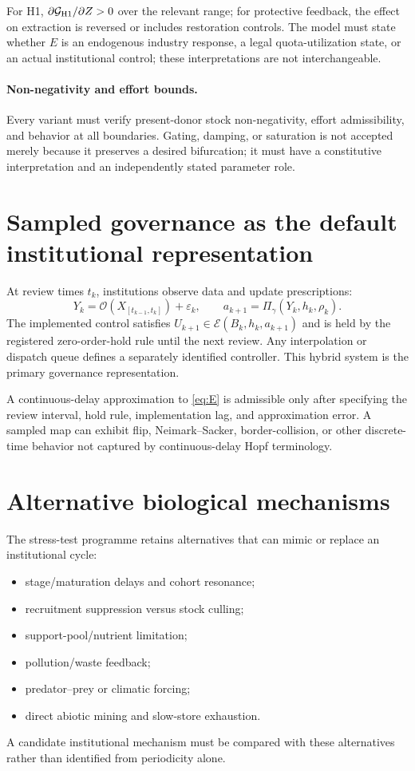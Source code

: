 \documentclass[11pt]{article}
\begin{document}
For H1, $\partial\mathcal G_{\rm H1}/\partial Z>0$ over the relevant range; for protective feedback, the effect on extraction is reversed or includes restoration controls. The model must state whether $E$ is an endogenous industry response, a legal quota-utilization state, or an actual institutional control; these interpretations are not interchangeable.

\paragraph{Non-negativity and effort bounds.} Every variant must verify present-donor stock non-negativity, effort admissibility, and behavior at all boundaries. Gating, damping, or saturation is not accepted merely because it preserves a desired bifurcation; it must have a constitutive interpretation and an independently stated parameter role.

\section{Sampled governance as the default institutional representation}
At review times $t_k$, institutions observe data and update prescriptions:
\[
Y_k=\mathcal O(X_{[t_{k-1},t_k]})+\varepsilon_k,
\qquad
a_{k+1}=\Pi_\gamma(Y_k,h_k,\rho_k).
\]
The implemented control satisfies $U_{k+1}\in\mathcal E(B_k,h_k,a_{k+1})$ and is held by the registered zero-order-hold rule until the next review. Any interpolation or dispatch queue defines a separately identified controller. This hybrid system is the primary governance representation.

A continuous-delay approximation to \eqref{eq:E} is admissible only after specifying the review interval, hold rule, implementation lag, and approximation error. A sampled map can exhibit flip, Neimark--Sacker, border-collision, or other discrete-time behavior not captured by continuous-delay Hopf terminology.

\section{Alternative biological mechanisms}
The stress-test programme retains alternatives that can mimic or replace an institutional cycle:
\begin{itemize}
\item stage/maturation delays and cohort resonance;
\item recruitment suppression versus stock culling;
\item support-pool/nutrient limitation;
\item pollution/waste feedback;
\item predator--prey or climatic forcing;
\item direct abiotic mining and slow-store exhaustion.
\end{itemize}
A candidate institutional mechanism must be compared with these alternatives rather than identified from periodicity alone.
\end{document}
